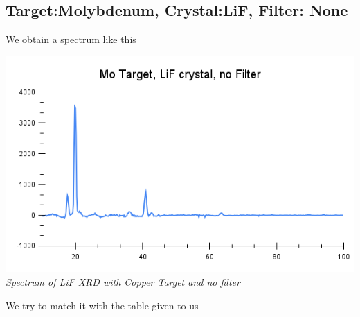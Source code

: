 \documentclass[]{report}[12 pt]
\begin{document}
\subsection*{Target:Molybdenum, Crystal:LiF, Filter: None}
We obtain a spectrum like this\\
\begin{center}
	\includegraphics[width=10 cm]{Mo Target, LiF crystal, No Filter.png}\\
	\textit{Spectrum of LiF XRD with Copper Target and no filter}
\end{center}
We try to match it with the table given to us
\end{document}
